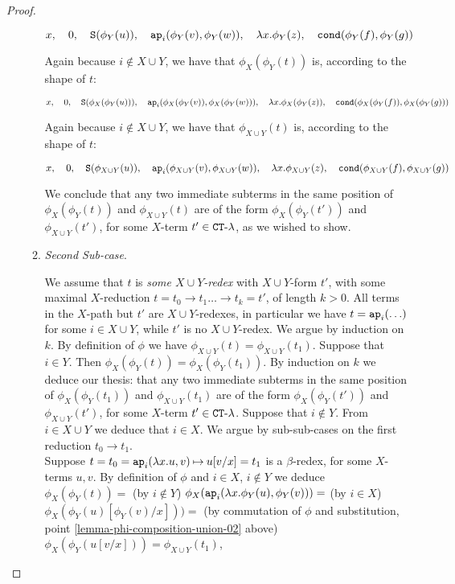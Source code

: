 \begin{proof}
\begin{enumerate}
\begin{enumerate}
$$ 
x, \ \ \ 
0, \ \ \  
\Succ(\phi_Y(u)),  \ \ \  
\ap_i(\phi_Y(v), \phi_Y(w)), \ \ \  
\lambda x.\phi_Y(z), \ \ \  
\cond(\phi_Y(f), \phi_Y(g))
$$

Again because $i \not \in X \cup Y$, 
we have that $\phi_{X}(\phi_{Y}(t))$ is, according to the shape of $t$:

$$ 
x, \ \ \ 
0, \ \ \  
\Succ(   \phi_X(\phi_Y(u))   ),  \ \ \  
\ap_i(  \phi_X(\phi_Y(v)),   \phi_X(\phi_Y(w))   ) , \ \ \  
\lambda x.   \phi_X(\phi_Y(z)), \ \ \  
\cond(   \phi_X(\phi_Y(f)), \phi_X(\phi_Y(g))  )
$$

Again because $i \not \in X \cup Y$, 
we have that $\phi_{X \cup Y}(t)$ is, according to the shape of $t$:

$$ 
x, \ \ \ 
0, \ \ \  
\Succ( \phi_{X \cup Y}(u)  ),  \ \ \  
\ap_i(  \phi_{X \cup Y}(v),   \phi_{X \cup Y}(w)   ) , \ \ \  
\lambda x.   \phi_{X \cup Y}(z), \ \ \  
\cond(   \phi_{X \cup Y}(f), \phi_{X \cup Y}(g)  )
$$

We conclude that any two immediate subterms in the same position of 
$\phi_{X}(\phi_{Y}(t)) $ and $\phi_{X \cup Y}(t)$ 
are of the form $\phi_{X}(\phi_{Y}(t')) $ and $\phi_{X \cup Y}(t')$, 
for some $X$-term $t' \in { {\tt CT}\mbox{-}\lambda}$, as we wished to show.

\item
\label{lemma-phi-composition-union-03b}
\emph{Second Sub-case}.

We assume that $t$ is \emph{some $X \cup Y$-redex} with $X \cup Y$-form $t'$, 
with some maximal $X$-reduction
$t=t_0 \rightarrow t_1 \ldots \rightarrow t_k = t'$, of length $k>0$. All terms  
in the $X$-path but $t'$ are $X \cup Y$-redexes, in particular we have $t = {\tt ap}_i(\ldots)$
for some $i \in X \cup Y$,
while $t'$ is no $X \cup Y$-redex. We argue by induction on $k$. 
By definition of $\phi$ we have $\phi_{X \cup Y}(t) = \phi_{X \cup Y}(t_1)$.
Suppose that $i \in Y$. Then 
$\phi_X(\phi_Y(t)) = \phi_X(\phi_Y(t_1))$. 
By induction on $k$ we deduce our thesis:
that any two immediate subterms in the same position of 
$\phi_{X}(\phi_{Y}(t_1)) $ and $\phi_{X \cup Y}(t_1)$ 
are of the form $\phi_{X}(\phi_{Y}(t')) $ and $\phi_{X \cup Y}(t')$, 
for some $X$-term $t' \in { {\tt CT}\mbox{-}\lambda}$.
Suppose that $i \not \in Y$. From $i \in X \cup Y$ we deduce that $i \in X$. 
We argue by sub-sub-cases on the first reduction $t_0 \rightarrow t_1$.
\\

Suppose $t = t_0 = {\tt ap}_i(\lambda x.u,v) \mathbin{\mapsto} u[v/x] = t_1$ is a $\beta$-redex,
for some $X$-terms $u,v$. By definition of $\phi$ and $i \in X$, $i \not \in Y$ we deduce 
$
\phi_X(\phi_Y(t)) = 
$ (by $i \not \in Y$) $
\phi_X({\tt ap}_i(  \lambda x.\phi_Y(u),  \phi_Y(v)  )) = 
$ (by $i \in X$) $
\phi_X( \phi_Y(u)[\phi_Y(v)/x]  )) =
$ (by commutation of $\phi$ and substitution, point \ref{lemma-phi-composition-union-02} above) $
\phi_X( \phi_Y(u[v/x])  ) = 
\phi_{X \cup Y}(t_1)
$, 


\end{enumerate}
\end{enumerate}
\end{proof}

